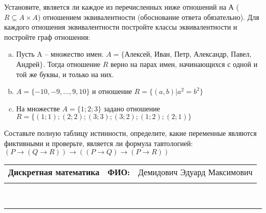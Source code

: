 \documentclass[10pt]{exam}
\newcommand{\class}{Дискретная математика}
\newcommand{\examdate}{}
\begin{document}
\begin{questions}
\question
Установите, является ли каждое из перечисленных ниже отношений на А ($R \subseteq A \times A$) отношением эквивалентности (обоснование ответа обязательно). Для каждого отношения эквивалентности постройте классы 
эквивалентности и постройте граф отношения:
\begin{enumerate} [a)]\setcounter{enumi}{0}
\item Пусть A – множество имен. $A = \{ $Алексей, Иван, Петр, Александр, Павел, Андрей$ \}$. Тогда отношение $R$ верно на парах имен, начинающихся с одной и той же буквы, и только на них.
\item $A = \{-10, -9, … , 9, 10\}$ и отношение $ R = \{(a,b)|a^{2} = b^{2}\}$
\item На множестве $A = \{1; 2; 3\}$ задано отношение $R = \{(1; 1); (2; 2); (3; 3); (3; 2); (1; 2); (2; 1)\}$
\end{enumerate}\question Составьте полную таблицу истинности, определите, какие переменные являются фиктивными и проверьте, является ли формула тавтологией:
$(P \rightarrow (Q \rightarrow R)) \rightarrow ((P \rightarrow Q) \rightarrow (P \rightarrow R))$

\end{questions}
\newpage
\begin{flushright}
\begin{tabular}{p{2.8in} r l}
\textbf{\class} & \textbf{ФИО:} &Демидович Эдуард Максимович
\\

\textbf{\examdate} &&\\
\end{tabular}\\
\end{flushright}
\rule[1ex]{\textwidth}{.1pt}
\end{document}
